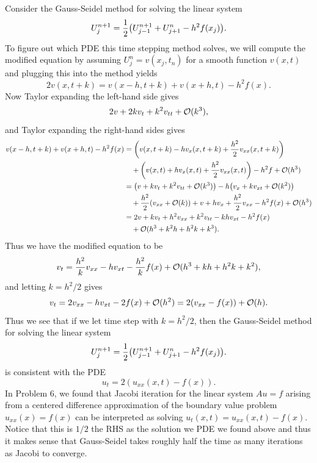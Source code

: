 \documentclass[12pt]{report}
\begin{document}
\begin{solution}

  \noindent
  Consider the Gauss-Seidel method for solving the linear system
  \[
    U_j^{n+1} = \frac{1}{2}{\left(U^{n+1}_{j-1} + U^n_{j+1}- h^2f(x_j)\right)}.
  \]
  To figure out which PDE this time stepping method solves, we will compute the modified equation by assuming $U_j^n = v(x_j,t_n)$ for a smooth function $v(x,t)$ and plugging this into the method yields
  \[ 
    2v(x,t+k) = v(x-h,t+k) + v(x+h,t) - h^2f(x).
  \]
  Now Taylor expanding the left-hand side gives
  \[
    2v + 2kv_t + k^2 v_{tt} + {\mathcal{O}}(k^3),
  \]
  and Taylor expanding the right-hand sides gives
  \begin{align*}
    v(x-h,t+k) + v(x+h,t) - h^2f(x) &= {\left( v(x,t+k) - hv_x(x,t+k) + \frac{h^2}{2}v_{xx}(x,t+k)\right)}\\
    &\quad + {\left(v(x,t) + hv_x(x,t) + \frac{h^2}{2}v_{xx}(x,t)\right)} - h^2f + {\mathcal{O}}(h^3)\\
    &= {\left(v + kv_t + k^2v_{tt} + {\mathcal{O}}(k^3)\right)} - h{\left(v_x + kv_{xt} + {\mathcal{O}}(k^2)\right)}\\
    &\quad + \frac{h^2}{2}{\left(v_{xx} + {\mathcal{O}}(k)\right)} + v + hv_x + \frac{h^2}{2}v_{xx} - h^2f(x) + {\mathcal{O}}(h^3)\\
    &= 2v + kv_t + h^2v_{xx} + k^2v_{tt} - khv_{xt} - h^2f(x) \\
    &\quad + {\mathcal{O}}(h^3 + k^2h + h^2k + k^3).
  \end{align*}
  Thus we have the modified equation to be
  \[
    v_t = \frac{h^2}{k}v_{xx} - hv_{xt} - \frac{h^2}{k}f(x) + {\mathcal{O}}(h^3 + kh + h^2k + k^2),
  \]
  and letting $k=h^2/2$ gives
  \[
    v_t = 2v_{xx} - hv_{xt} - 2f(x) + {\mathcal{O}}(h^2) = 2(v_{xx} - f(x)) + {\mathcal{O}}(h).
  \]
  Thus we see that if we let time step with $k = h^2/2$, then the Gauss-Seidel method for solving the linear system
  \[
    U_j^{n+1} = \frac{1}{2}{\left(U^{n+1}_{j-1} + U^n_{j+1}- h^2f(x_j)\right)}.
  \]
  is consistent with the PDE
  \[
    u_t = 2(u_{xx}(x,t) - f(x)).
  \]
  In Problem 6, we found that Jacobi iteration for the linear system $Au = f$ arising from a centered difference approximation of the boundary value problem $u_{xx}(x) = f(x)$ can be interpreted as solving $u_t(x,t) = u_{xx}(x,t) - f(x)$. Notice that this is $1/2$ the RHS as the solution we PDE we found above and thus it makes sense that Gauss-Seidel takes roughly half the time as many iterations as Jacobi to converge.



\end{solution}

\newpage
\end{document}
